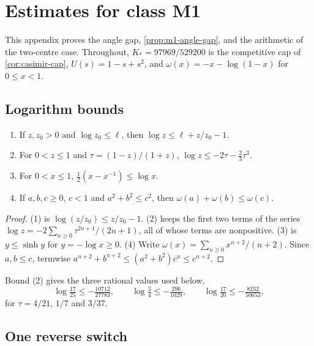 \section{Estimates for class M1}\label{app:short-run-estimates}

This appendix proves the angle gap, \cref{prop:m1-angle-gap}, and the arithmetic of the two-centre
case. Throughout, $K_*=97969/529200$ is the competitive cap of \cref{cor:casimir-cap},
$U(s)=1-s+s^2$, and $\omega(x)=-x-\log(1-x)$ for $0\le x<1$.

\subsection{Logarithm bounds}

\begin{lemma}\label{lem:m1-log}
  \begin{enumerate}[label=\textup{(\arabic*)}]
    \item If $z,z_0>0$ and $\log z_0\le\ell$, then $\log z\le\ell+z/z_0-1$.
    \item For $0<z\le1$ and $\tau=(1-z)/(1+z)$, $\log z\le-2\tau-\frac23\tau^3$.
    \item For $0<x\le1$, $\frac12(x-x^{-1})\le\log x$.
    \item If $a,b,c\ge0$, $c<1$ and $a^2+b^2\le c^2$, then $\omega(a)+\omega(b)\le\omega(c)$.
  \end{enumerate}
\end{lemma}

\begin{proof}
  (1) is $\log(z/z_0)\le z/z_0-1$. (2) keeps the first two terms of the series
  $\log z=-2\sum_{n\ge0}\tau^{2n+1}/(2n+1)$, all of whose terms are nonpositive. (3) is
  $y\le\sinh y$ for $y=-\log x\ge0$. (4) Write $\omega(x)=\sum_{n\ge0}x^{n+2}/(n+2)$. Since
  $a,b\le c$, termwise $a^{n+2}+b^{n+2}\le(a^2+b^2)c^n\le c^{n+2}$.
\end{proof}

Bound (2) gives the three rational values used below,
\begin{equation}\label{eq:m1-logs}
  \log\tfrac{17}{25}\le-\tfrac{10712}{27783},\qquad
  \log\tfrac34\le-\tfrac{296}{1029},\qquad
  \log\tfrac{17}{20}\le-\tfrac{8232}{50653},
\end{equation}
for $\tau=4/21$, $1/7$ and $3/37$.

\subsection{One reverse switch}

